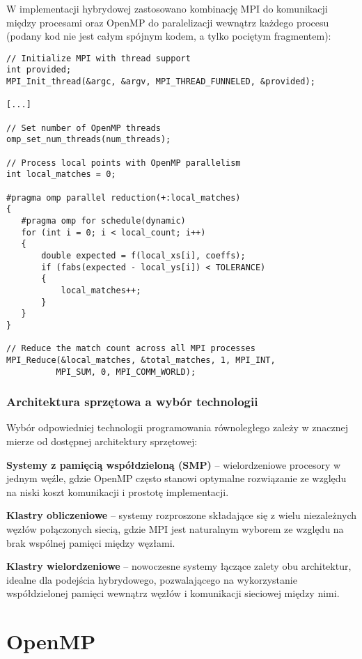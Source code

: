 \documentclass[12pt,a4paper]{report}
\begin{document}
W implementacji hybrydowej zastosowano kombinację MPI do komunikacji między procesami oraz OpenMP do paralelizacji wewnątrz każdego procesu (podany kod nie jest całym spójnym kodem, a tylko pociętym fragmentem):

\begin{verbatim}
// Initialize MPI with thread support
int provided;
MPI_Init_thread(&argc, &argv, MPI_THREAD_FUNNELED, &provided);

[...]

// Set number of OpenMP threads
omp_set_num_threads(num_threads);

// Process local points with OpenMP parallelism
int local_matches = 0;

#pragma omp parallel reduction(+:local_matches)
{
   #pragma omp for schedule(dynamic)
   for (int i = 0; i < local_count; i++)
   {
       double expected = f(local_xs[i], coeffs);
       if (fabs(expected - local_ys[i]) < TOLERANCE)
       {
           local_matches++;
       }
   }
}

// Reduce the match count across all MPI processes
MPI_Reduce(&local_matches, &total_matches, 1, MPI_INT, 
          MPI_SUM, 0, MPI_COMM_WORLD);
\end{verbatim}

\subsection{Architektura sprzętowa a wybór technologii}

Wybór odpowiedniej technologii programowania równoległego zależy w znacznej mierze od dostępnej architektury sprzętowej:

\textbf{Systemy z pamięcią współdzieloną (SMP)} -- wielordzeniowe procesory w jednym węźle, gdzie OpenMP często stanowi optymalne rozwiązanie ze względu na niski koszt komunikacji i prostotę implementacji.

\textbf{Klastry obliczeniowe} -- systemy rozproszone składające się z wielu niezależnych węzłów połączonych siecią, gdzie MPI jest naturalnym wyborem ze względu na brak wspólnej pamięci między węzłami.

\textbf{Klastry wielordzeniowe} -- nowoczesne systemy łączące zalety obu architektur, idealne dla podejścia hybrydowego, pozwalającego na wykorzystanie współdzielonej pamięci wewnątrz węzłów i komunikacji sieciowej między nimi.

\chapter{OpenMP}
\end{document}
